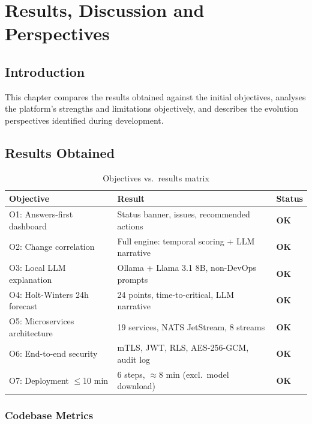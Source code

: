 \chapter{Results, Discussion and Perspectives}

\section*{Introduction}

This chapter compares the results obtained against the initial objectives, analyses
the platform's strengths and limitations objectively, and describes the evolution
perspectives identified during development.

\section{Results Obtained}

\begin{table}[H]
\centering
\caption{Objectives vs.\ results matrix}
\label{tab:obj-results}
\begin{tabularx}{\textwidth}{lXl}
\toprule
\textbf{Objective} & \textbf{Result} & \textbf{Status} \\
\midrule
O1: Answers-first dashboard
  & Status banner, issues, recommended actions
  & \textcolor{SuccessGreen}{\textbf{OK}} \\
O2: Change correlation
  & Full engine: temporal scoring + LLM narrative
  & \textcolor{SuccessGreen}{\textbf{OK}} \\
O3: Local LLM explanation
  & Ollama + Llama 3.1 8B, non-DevOps prompts
  & \textcolor{SuccessGreen}{\textbf{OK}} \\
O4: Holt-Winters 24h forecast
  & 24 points, time-to-critical, LLM narrative
  & \textcolor{SuccessGreen}{\textbf{OK}} \\
O5: Microservices architecture
  & 19 services, NATS JetStream, 8 streams
  & \textcolor{SuccessGreen}{\textbf{OK}} \\
O6: End-to-end security
  & mTLS, JWT, RLS, AES-256-GCM, audit log
  & \textcolor{SuccessGreen}{\textbf{OK}} \\
O7: Deployment $\leq$10 min
  & 6 steps, $\approx$8 min (excl.\ model download)
  & \textcolor{SuccessGreen}{\textbf{OK}} \\
\bottomrule
\end{tabularx}
\end{table}

\subsection{Codebase Metrics}

